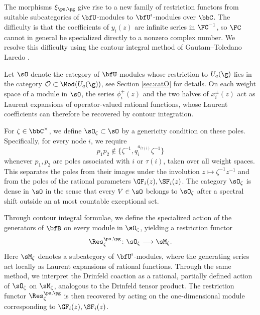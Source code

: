 \documentclass[reqno]{amsart}
\numberwithin{equation}{section}
\begin{document}
\subsection{}
The morphisms $\xi_{\ps,\pg}$ give rise to a new family of restriction functors from 
suitable subcategories of $\bfU$-modules to $\bfU^\imath$-modules over $\bbC$.
The difficulty is that the coefficients of $y_i(z)$ are infinite series in $\FC^{-1}$, so 
$\FC$ cannot in general be specialized directly to a nonzero complex number.
We resolve this difficulty using the contour integral method of Gautam--Toledano 
Laredo \cite{gautam-toledano-16,gautam-toledano-17}.

Let $\sO$ denote the category of $\bfU$-modules whose restriction to $U_q(\g)$ lies 
in the category $\mathcal O \subset \Mod(U_q(\g))$, see Section \ref{sec:catO} for details.
On each weight space of a module in $\sO$, the series $\phi_i^\pm(z)$ and the two 
halves of $x_i^\pm(z)$ act as Laurent expansions of operator-valued rational 
functions, whose Laurent coefficients can therefore be recovered by contour integration.

For $\zeta\in\bbC^\times$, we define $\sO_\zeta\subset\sO$ by a genericity condition 
on these poles.
Specifically, for every node $i$, we require
\[
p_1p_2\notin\{\zeta^{-1},q_i^{a_{i\tau(i)}}\zeta^{-1}\}
\]
whenever $p_1,p_2$ are poles associated with $i$ or $\tau(i)$, taken over all weight 
spaces.
This separates the poles from their images under the involution 
$z\mapsto\zeta^{-1}z^{-1}$ and 
from the poles of the rational parameters $\GF_i(z),\SF_i(z)$.
The category $\sO_\zeta$ is dense in $\sO$ in the sense that every $V\in\sO$ belongs to 
$\sO_\zeta$ after a spectral shift outside an at most countable exceptional set.

Through contour integral formulae, we define the specialized action of the generators 
of $\bfB$ on every module in $\sO_\zeta$, yielding a restriction functor
\begin{equation}\label{eq:intro-restriction}
	\Res_{\zeta}^{\ps,\pg}\colon\sO_\zeta\longrightarrow\sM_\zeta.
\end{equation}
Here $\sM_\zeta$ denotes a subcategory of $\bfU^\imath$-modules, where the 
generating series act locally as Laurent expansions of rational functions.
Through the same method, we interpret the Drinfeld coaction as a rational, partially 
defined action of $\sO_\zeta$ on $\sM_\zeta$, analogous to the Drinfeld tensor product.
The restriction functor $\Res_{\zeta}^{\ps,\pg}$ is then recovered by acting on the one-dimensional module corresponding to $\GF_i(z), \SF_i(z)$.
\end{document}
